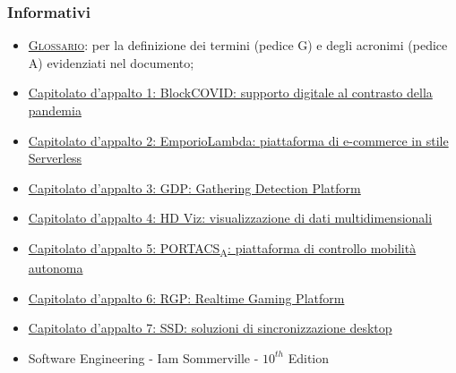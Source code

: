 \subsubsection{Informativi}
\begin{itemize}
	\item \textsc{\href{https://github.com/Three-Way-Milkshake/docs/wiki/Glossario}{Glossario}}: per la definizione dei termini (pedice G) e degli acronimi (pedice A) evidenziati nel documento;
	\item \href{https://www.math.unipd.it/~tullio/IS-1/2020/Progetto/C1.pdf}{Capitolato d'appalto 1: BlockCOVID: supporto digitale al contrasto della pandemia}\\
	\item \href{https://www.math.unipd.it/~tullio/IS-1/2020/Progetto/C2.pdf}{Capitolato d'appalto 2: EmporioLambda: piattaforma di e-commerce in stile Serverless}\\
	\item \href{https://www.math.unipd.it/~tullio/IS-1/2020/Progetto/C3.pdf}{Capitolato d'appalto 3: GDP: Gathering Detection Platform}\\
	\item \href{https://www.math.unipd.it/~tullio/IS-1/2020/Progetto/C4.pdf}{Capitolato d'appalto 4: HD Viz: visualizzazione di dati multidimensionali}\\
	\item \href{https://www.math.unipd.it/~tullio/IS-1/2020/Progetto/C5.pdf}{Capitolato d'appalto 5: PORTACS\textsubscript{A}: piattaforma di controllo mobilità autonoma}\\
    \item \href{https://sesaspa-my.sharepoint.com/:b:/g/personal/s_dindo_vargroup_it/EThvay0f6KVCoXydYOce2lkBt-MYcnW1yafRXFXVIOIsHg?e=2emZZI}{Capitolato d'appalto 6: RGP: Realtime Gaming Platform}\\
	\item \href{https://www.math.unipd.it/~tullio/IS-1/2020/Progetto/C7.pdf}{Capitolato d'appalto 7: SSD: soluzioni di sincronizzazione desktop}\\
	\item Software Engineering - Iam Sommerville - $10^{th}$ Edition
\end{itemize}